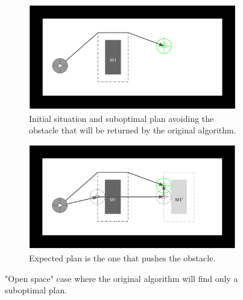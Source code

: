 \begin{figure}[H]
\centering
\begin{subfigure}{.45\textwidth}
  \centering
  \includegraphics[width=\linewidth]{Figures/Check_New_Opening/openspace_original.png}
  \caption{Initial situation and suboptimal plan avoiding the obstacle that will be returned by the original algorithm.}
  \label{fig:openspace_original}
\end{subfigure}%
\begin{subfigure}{.45\textwidth}
  \centering
  \includegraphics[width=\linewidth]{Figures/Check_New_Opening/openspace_optimal_path.png}
  \caption{Expected plan is the one that pushes the obstacle.}
  \label{fig:openspace_optimal_path}
\end{subfigure}
\caption{"Open space" case where the original algorithm will find only a suboptimal plan.}
\label{fig:openspace_case}
\end{figure}

